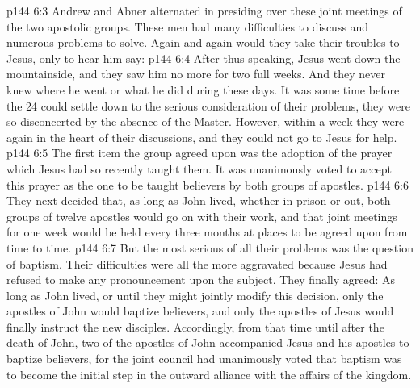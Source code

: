 \vs p144 6:3 Andrew and Abner alternated in presiding over these joint meetings of the two apostolic groups. These men had many difficulties to discuss and numerous problems to solve. Again and again would they take their troubles to Jesus, only to hear him say: 
\vs p144 6:4 After thus speaking, Jesus went down the mountainside, and they saw him no more for two full weeks. And they never knew where he went or what he did during these days. It was some time before the 24 could settle down to the serious consideration of their problems, they were so disconcerted by the absence of the Master. However, within a week they were again in the heart of their discussions, and they could not go to Jesus for help.
\vs p144 6:5 \pc The first item the group agreed upon was the adoption of the prayer which Jesus had so recently taught them. It was unanimously voted to accept this prayer as the one to be taught believers by both groups of apostles.
\vs p144 6:6 They next decided that, as long as John lived, whether in prison or out, both groups of twelve apostles would go on with their work, and that joint meetings for one week would be held every three months at places to be agreed upon from time to time.
\vs p144 6:7 But the most serious of all their problems was the question of baptism. Their difficulties were all the more aggravated because Jesus had refused to make any pronouncement upon the subject. They finally agreed: As long as John lived, or until they might jointly modify this decision, only the apostles of John would baptize believers, and only the apostles of Jesus would finally instruct the new disciples. Accordingly, from that time until after the death of John, two of the apostles of John accompanied Jesus and his apostles to baptize believers, for the joint council had unanimously voted that baptism was to become the initial step in the outward alliance with the affairs of the kingdom.
